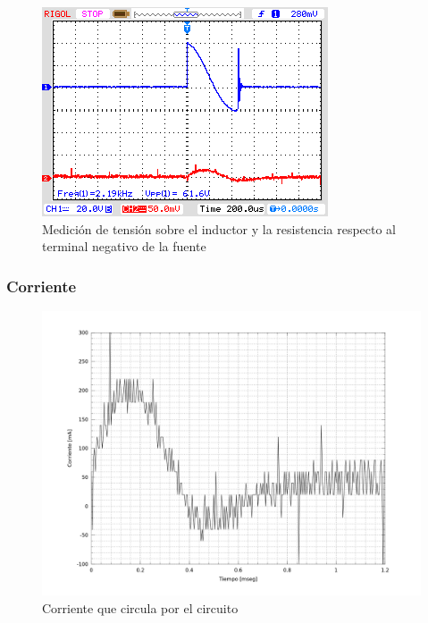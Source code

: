 \documentclass[a4paper,10pt]{article}
\begin{document}
\begin{figure}[H] %
\begin{center}
\includegraphics[scale=0.8]{./imagenes/tiristor_medicion1.png}
\caption{Medición de tensión sobre el inductor y la resistencia respecto al terminal negativo de la fuente}
 \label{fig:Med1_tiristor}
\end{center}
\end{figure}

\subsubsection*{Corriente}

\begin{figure}[H] %
\begin{center}
\includegraphics[scale=0.3]{./imagenes/Corriente1.png}
\caption{Corriente que circula por el circuito}
 \label{fig:Corriente1_tiristor}
\end{center}
\end{figure}
\end{document}
